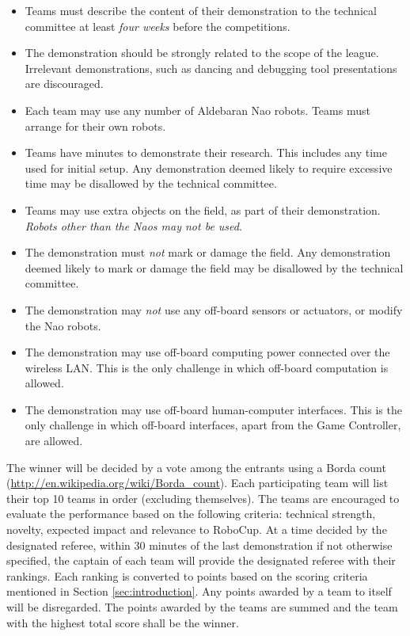 \documentclass{article}
\begin{document}
\begin{itemize}
\item 
Teams must describe the content of their demonstration to the technical 
committee at least \emph{four weeks} before the competitions. 
\item 
The demonstration should be strongly related to the scope of the league. 
Irrelevant demonstrations, such as dancing and debugging tool presentations 
are discouraged.
\item 
Each team may use any number of Aldebaran Nao robots. Teams must arrange
for their own robots.
\item 
Teams have \openMinNum{} minutes to demonstrate their research. This
includes any time used for initial setup. Any demonstration deemed
likely to require excessive time may be disallowed by the technical
committee.
\item 
Teams may use extra objects on the field, as part of their
demonstration. \emph{Robots other than the Naos may not be used}.
\item 
The demonstration must \emph{not} mark or damage the field. Any
demonstration deemed likely to mark or damage the field may be
disallowed by the technical committee.
\item 
The demonstration may \emph{not} use any off-board sensors or
actuators, or modify the Nao robots.
\item 
The demonstration may use off-board computing power connected over the
wireless LAN. This is the only challenge in which off-board
computation is allowed.
\item 
The demonstration may use off-board human-computer interfaces. This
is the only challenge in which off-board interfaces, apart from the
Game Controller, are allowed.
\end{itemize}

The winner will be decided by a vote among the entrants using a Borda
count (\url{http://en.wikipedia.org/wiki/Borda_count}). Each participating 
team will list their top 10 teams in order (excluding themselves).
The teams are encouraged to evaluate the performance based on the
following criteria: technical strength, novelty, expected impact and
relevance to RoboCup. At a time decided by the designated referee,
within 30 minutes of the last demonstration if not otherwise
specified, the captain of each team will provide the designated
referee with their rankings. Each ranking is converted to points based on 
the scoring criteria mentioned in Section \ref{sec:introduction}. Any 
points awarded by a team to itself will be disregarded. The points awarded 
by the teams are summed and the team with the highest total score shall be 
the winner.
\end{document}
